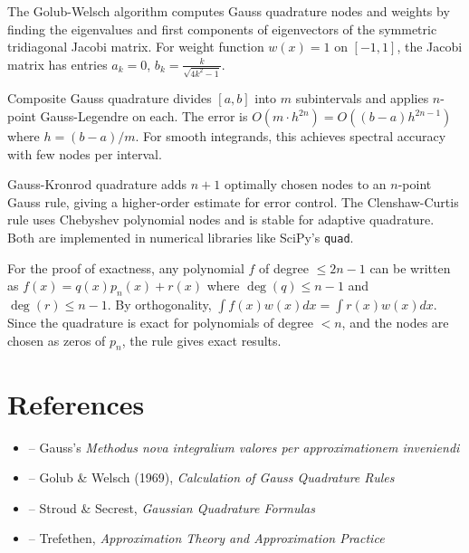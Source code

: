 \begin{solution}
The Golub-Welsch algorithm computes Gauss quadrature nodes and weights by finding the eigenvalues and first components of eigenvectors of the symmetric tridiagonal Jacobi matrix. For weight function $w(x) = 1$ on $[-1,1]$, the Jacobi matrix has entries $a_k = 0$, $b_k = \frac{k}{\sqrt{4k^2-1}}$.
\end{solution}

\begin{solution}
Composite Gauss quadrature divides $[a,b]$ into $m$ subintervals and applies $n$-point Gauss-Legendre on each. The error is $O(m \cdot h^{2n}) = O((b-a)h^{2n-1})$ where $h = (b-a)/m$. For smooth integrands, this achieves spectral accuracy with few nodes per interval.
\end{solution}

\begin{solution}
Gauss-Kronrod quadrature adds $n+1$ optimally chosen nodes to an $n$-point Gauss rule, giving a higher-order estimate for error control. The Clenshaw-Curtis rule uses Chebyshev polynomial nodes and is stable for adaptive quadrature. Both are implemented in numerical libraries like SciPy's \texttt{quad}.
\end{solution}

\begin{solution}
For the proof of exactness, any polynomial $f$ of degree $\le 2n-1$ can be written as $f(x) = q(x)p_n(x) + r(x)$ where $\deg(q) \le n-1$ and $\deg(r) \le n-1$. By orthogonality, $\int f(x)w(x)dx = \int r(x)w(x)dx$. Since the quadrature is exact for polynomials of degree $< n$, and the nodes are chosen as zeros of $p_n$, the rule gives exact results.
\end{solution}


\section{References}

\begin{itemize}
    \item \cite{gauss-works} -- Gauss's \textit{Methodus nova integralium valores per approximationem inveniendi}
    \item \cite{golub-welsch} -- Golub \& Welsch (1969), \textit{Calculation of Gauss Quadrature Rules}
    \item \cite{stroud-secrest} -- Stroud \& Secrest, \textit{Gaussian Quadrature Formulas}
    \item \cite{trefethen-approx} -- Trefethen, \textit{Approximation Theory and Approximation Practice}
\end{itemize}